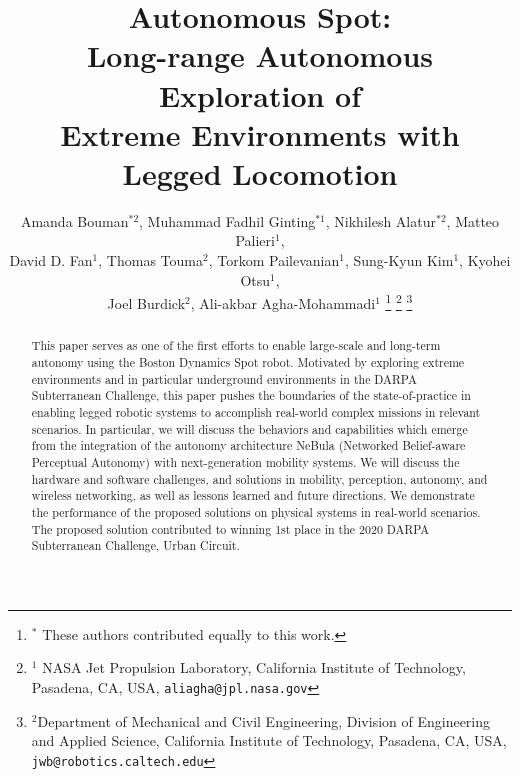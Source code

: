 \documentclass[letterpaper, 10pt, conference]{ieeeconf}      %
\title{\LARGE \bf
Autonomous Spot: \\
Long-range Autonomous Exploration of \\Extreme Environments with Legged Locomotion
}
\author{Amanda Bouman$^{*2}$, Muhammad Fadhil Ginting$^{*1}$, Nikhilesh Alatur$^{*2}$, Matteo Palieri$^{1}$, \\
David D. Fan$^{1}$, Thomas Touma$^{2}$, Torkom Pailevanian$^{1}$, Sung-Kyun Kim$^{1}$, Kyohei Otsu$^{1}$,\\
Joel Burdick$^{2}$, Ali-akbar Agha-Mohammadi$^{1}$%
\thanks{$^*$ These authors contributed equally to this work.}
\thanks{$^{1}$ NASA Jet Propulsion Laboratory, California Institute of Technology, Pasadena, CA, USA,
     {\tt\small aliagha@jpl.nasa.gov}}%
\thanks{$^{2}$Department of Mechanical and Civil Engineering, Division of Engineering and Applied Science, California Institute of Technology, Pasadena, CA, USA,
         {\tt\small jwb@robotics.caltech.edu}}%
}
\newcommand{\ph}[1]{{\textbf{#1}:}} %
\newcommand{\inst}[1]{{\color{orange} #1 }} %
\newcommand{\rev}[1]{{\color{blue} #1 }} %
\begin{document}
\maketitle
\thispagestyle{empty}
\pagestyle{empty}
\begin{abstract}
This paper serves as one of the first efforts to enable large-scale and long-term autonomy using the Boston Dynamics Spot robot. 
Motivated by exploring extreme environments and in particular underground environments in the DARPA Subterranean Challenge, this paper pushes the boundaries of the state-of-practice in enabling legged robotic systems to accomplish real-world complex missions in relevant scenarios. 
In particular, we will discuss the behaviors and capabilities which emerge from the integration of the autonomy \rev{architecture}NeBula (Networked Belief-aware Perceptual Autonomy) with next-generation mobility systems.
We will discuss the \rev{hardware and software}challenges, and solutions in mobility, perception, autonomy, and wireless networking, as well as lessons learned and future directions. 
We demonstrate the performance of the proposed solutions on physical systems in real-world scenarios.
\rev{The proposed solution contributed}to winning 1st place in the 2020 DARPA Subterranean Challenge, Urban Circuit.
\end{abstract}



\end{document}
